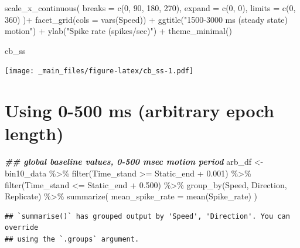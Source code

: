 \documentclass[
]{book}
\newenvironment{Shaded}{\begin{snugshade}}{\end{snugshade}}
\newcommand{\AttributeTok}[1]{\textcolor[rgb]{0.77,0.63,0.00}{#1}}
\newcommand{\DecValTok}[1]{\textcolor[rgb]{0.00,0.00,0.81}{#1}}
\newcommand{\DocumentationTok}[1]{\textcolor[rgb]{0.56,0.35,0.01}{\textbf{\textit{#1}}}}
\newcommand{\FloatTok}[1]{\textcolor[rgb]{0.00,0.00,0.81}{#1}}
\newcommand{\FunctionTok}[1]{\textcolor[rgb]{0.00,0.00,0.00}{#1}}
\newcommand{\NormalTok}[1]{#1}
\newcommand{\OtherTok}[1]{\textcolor[rgb]{0.56,0.35,0.01}{#1}}
\newcommand{\SpecialCharTok}[1]{\textcolor[rgb]{0.00,0.00,0.00}{#1}}
\newcommand{\StringTok}[1]{\textcolor[rgb]{0.31,0.60,0.02}{#1}}
\begin{document}
\begin{Shaded}
\begin{Highlighting}[]
  \FunctionTok{scale\_x\_continuous}\NormalTok{(}
    \AttributeTok{breaks =} \FunctionTok{c}\NormalTok{(}\DecValTok{0}\NormalTok{, }\DecValTok{90}\NormalTok{, }\DecValTok{180}\NormalTok{, }\DecValTok{270}\NormalTok{),}
    \AttributeTok{expand =} \FunctionTok{c}\NormalTok{(}\DecValTok{0}\NormalTok{, }\DecValTok{0}\NormalTok{),}
    \AttributeTok{limits =} \FunctionTok{c}\NormalTok{(}\DecValTok{0}\NormalTok{, }\DecValTok{360}\NormalTok{)}
\NormalTok{  )}\SpecialCharTok{+}
  \FunctionTok{facet\_grid}\NormalTok{(}\AttributeTok{cols =} \FunctionTok{vars}\NormalTok{(Speed)) }\SpecialCharTok{+}
  \FunctionTok{ggtitle}\NormalTok{(}\StringTok{"1500{-}3000 ms (steady state) motion"}\NormalTok{) }\SpecialCharTok{+}
  \FunctionTok{ylab}\NormalTok{(}\StringTok{"Spike rate (spikes/sec)"}\NormalTok{) }\SpecialCharTok{+}
  \FunctionTok{theme\_minimal}\NormalTok{()}

\NormalTok{cb\_ss}
\end{Highlighting}
\end{Shaded}

\texttt{[image: \_main\_files/figure-latex/cb\_ss-1.pdf]}

\hypertarget{using-0-500-ms-arbitrary-epoch-length}{%
\section{Using 0-500 ms (arbitrary epoch length)}\label{using-0-500-ms-arbitrary-epoch-length}}

\begin{Shaded}
\begin{Highlighting}[]
\DocumentationTok{\#\# global baseline values, 0{-}500 msec motion period}
\NormalTok{arb\_df }\OtherTok{\textless{}{-}}
\NormalTok{  bin10\_data }\SpecialCharTok{\%\textgreater{}\%}
  \FunctionTok{filter}\NormalTok{(Time\_stand }\SpecialCharTok{\textgreater{}=}\NormalTok{ Static\_end }\SpecialCharTok{+} \FloatTok{0.001}\NormalTok{) }\SpecialCharTok{\%\textgreater{}\%}
  \FunctionTok{filter}\NormalTok{(Time\_stand }\SpecialCharTok{\textless{}=}\NormalTok{ Static\_end }\SpecialCharTok{+} \FloatTok{0.500}\NormalTok{) }\SpecialCharTok{\%\textgreater{}\%}
  \FunctionTok{group\_by}\NormalTok{(Speed, Direction, Replicate) }\SpecialCharTok{\%\textgreater{}\%}
  \FunctionTok{summarize}\NormalTok{(}
    \AttributeTok{mean\_spike\_rate =} \FunctionTok{mean}\NormalTok{(Spike\_rate)}
\NormalTok{  )}
\end{Highlighting}
\end{Shaded}

\begin{verbatim}
## `summarise()` has grouped output by 'Speed', 'Direction'. You can override
## using the `.groups` argument.
\end{verbatim}
\end{document}
